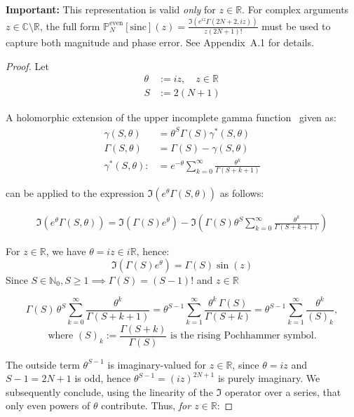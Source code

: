 \begin{lemma}\label{lem:hypergeom_real}

\textbf{Important:} This representation is valid \emph{only} for $z \in \mathbb{R}$. For complex arguments $z \in \mathbb{C} \setminus \mathbb{R}$, the full form $\mathbb{P}_N^{\text{even}}[\mathrm{sinc}](z) = \frac{\Im(e^{iz}\Gamma(2N+2,iz))}{z(2N+1)!}$ must be used to capture both magnitude and phase error. See Appendix~A.1 for details.

\begin{proof}
Let
\[
\begin{aligned}
\theta &:= i z, \quad z \in \mathbb{R}\\
S &:= 2(N+1)
\end{aligned}
\]

A holomorphic extension of the upper incomplete gamma function~\cite{NIST:DLMF} given as:
\[
\begin{aligned}
\gamma(S, \theta) &= \theta^S \Gamma(S) \gamma^{*}(S, \theta)\\
\Gamma(S, \theta) &= \Gamma(S) - \gamma(S, \theta)\\
\gamma^{*}(S, \theta) :&= e^{-\theta} \sum_{k=0}^\infty \frac{\theta^k}{\Gamma(S + k + 1)}
\end{aligned}
\]

can be applied to the expression $\Im(e^{\theta}\Gamma(S, \theta))$ as follows:

\[
\begin{aligned}
\Im(e^\theta \Gamma(S, \theta)) = \Im(\Gamma(S)e^\theta) - \Im\left(\Gamma(S)\theta^S \sum_{k=0}^\infty \frac{\theta^k}{\Gamma(S + k + 1)}\right)
\end{aligned}
\]

For $z \in \mathbb{R}$, we have $\theta = iz \in i\mathbb{R}$, hence:
\[
\Im(\Gamma(S)e^\theta) = \Gamma(S)\sin(z)
\]
Since $S \in \mathbb{N}_0, S \geq 1 \implies \Gamma(S) = (S - 1)!$ and $z \in \mathbb{R}$

\[
\Gamma(S)\,\theta^S \sum_{k=0}^{\infty} \frac{\theta^{k}}{\Gamma(S+k+1)}
= \theta^{S-1} \sum_{k=1}^{\infty} \frac{\theta^{k}\,\Gamma(S)}{\Gamma(S+k)}
= \theta^{S-1} \sum_{k=1}^{\infty} \frac{\theta^{k}}{(S)_k},
\]
\[
\text{where } (S)_k := \frac{\Gamma(S+k)}{\Gamma(S)} \text{ is the rising Pochhammer symbol.}
\]

\noindent The outside term $\theta^{S-1}$ is imaginary-valued for $z \in \mathbb{R}$, since $\theta = iz$ and $S - 1 = 2N + 1$ is odd, hence $\theta^{S-1} = (iz)^{2N+1}$ is purely imaginary. We subsequently conclude, using the linearity of the $\Im$ operator over a series, that only even powers of $\theta$ contribute. Thus, \emph{for $z \in \mathbb{R}$}:


\end{proof}
\end{lemma}
